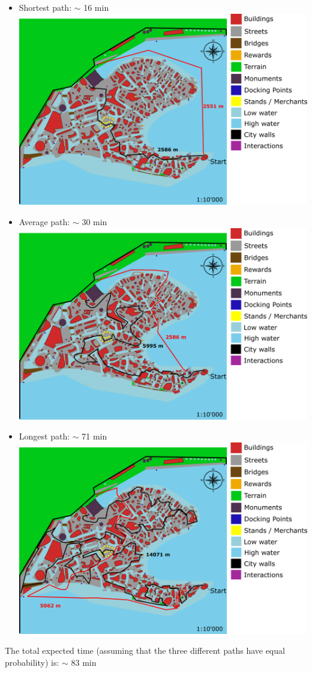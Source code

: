 \begin{itemize}
\item Shortest path: $\sim$ 16 min \\
\includegraphics[scale=0.3]{Images/Diagrams/dynamiapath1.png}
\item Average path: $\sim$ 30 min \\
\includegraphics[scale=0.226]{Images/Diagrams/dynamiapath2.png}
\item Longest path: $\sim$ 71 min \\
\includegraphics[scale=0.3]{Images/Diagrams/dynamiapath3.png}
\end{itemize}

The total expected time (assuming that the three different paths have equal probability) is:  $\sim$ 83 min

